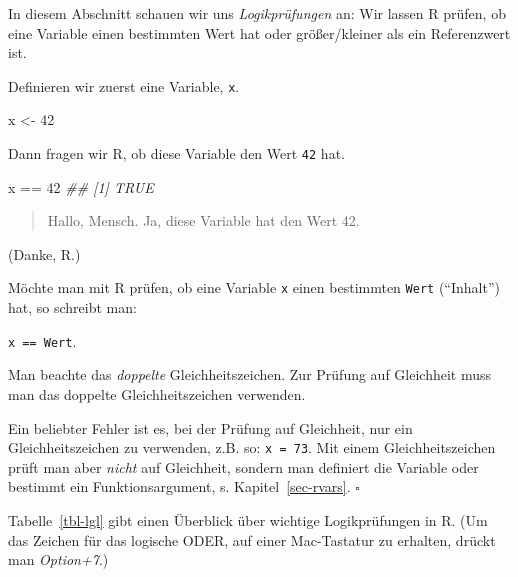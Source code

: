 \documentclass[
  letterpaper,
]{scrbook}
\newenvironment{Shaded}{\begin{snugshade}}{\end{snugshade}}
\newcommand{\DecValTok}[1]{\textcolor[rgb]{0.68,0.00,0.00}{#1}}
\newcommand{\DocumentationTok}[1]{\textcolor[rgb]{0.37,0.37,0.37}{\textit{#1}}}
\newcommand{\NormalTok}[1]{\textcolor[rgb]{0.00,0.23,0.31}{#1}}
\newcommand{\OtherTok}[1]{\textcolor[rgb]{0.00,0.23,0.31}{#1}}
\newcommand{\SpecialCharTok}[1]{\textcolor[rgb]{0.37,0.37,0.37}{#1}}
\theoremstyle{definition}
\theoremstyle{definition}
\theoremstyle{definition}
\theoremstyle{remark}
\begin{document}
In diesem Abschnitt schauen wir uns \emph{Logikprüfungen} an: Wir lassen
R prüfen, ob eine Variable einen bestimmten Wert hat oder größer/kleiner
als ein Referenzwert ist.

Definieren wir zuerst eine Variable, \texttt{x}.

\begin{Shaded}
\begin{Highlighting}[]
\NormalTok{x }\OtherTok{\textless{}{-}} \DecValTok{42}
\end{Highlighting}
\end{Shaded}

Dann fragen wir R, ob diese Variable den Wert \texttt{42} hat.

\begin{Shaded}
\begin{Highlighting}[]
\NormalTok{x }\SpecialCharTok{==} \DecValTok{42}
\DocumentationTok{\#\# [1] TRUE}
\end{Highlighting}
\end{Shaded}

\begin{quote}
{} Hallo, Mensch. Ja, diese Variable hat den Wert 42.
\end{quote}

(Danke, R.)

Möchte man mit R prüfen, ob eine Variable \texttt{x} einen bestimmten
\texttt{Wert} (``Inhalt'') hat, so schreibt man:

\texttt{x\ ==\ Wert}.

Man beachte das \emph{doppelte} Gleichheitszeichen. Zur Prüfung auf
Gleichheit muss man das doppelte Gleichheitszeichen verwenden.

Ein beliebter Fehler ist es, bei der Prüfung auf Gleichheit, nur ein
Gleichheitszeichen zu verwenden, z.B. so: \texttt{x\ =\ 73}. Mit einem
Gleichheitszeichen prüft man aber \emph{nicht} auf Gleichheit, sondern
man definiert die Variable oder bestimmt ein Funktionsargument, s.
Kapitel~\ref{sec-rvars}. \(\square\)

Tabelle~\ref{tbl-lgl} gibt einen Überblick über wichtige Logikprüfungen
in R. (Um das Zeichen für das logische ODER, \texttt{\textbar{}} auf
einer Mac-Tastatur zu erhalten, drückt man \emph{Option+7}.)
\end{document}
